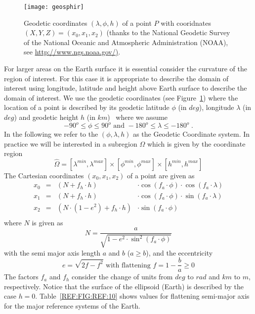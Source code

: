 \begin{figure}[t]
    \centering\texttt{[image: geosphir]}
    \caption{Geodetic coordinates  $( \lambda, \phi,h)$ of a point $P$ with 
cooridnates $(X,Y,Z)=(x_0,x_1,x_2)$ (thanks to the National Geodetic Survey of the National Oceanic and Atmospheric Administration (NOAA), 
see \url{http://www.ngs.noaa.gov/)}.
}
    \label{fig:geodeticDomain}
\end{figure}
For larger areas on the Earth surface it is essential consider the curvature of the region of interest. For this case 
it is appropriate to describe the domain of interest using longitude, latitude and height above Earth surface to describe 
the domain of interest. We use the geodetic coordinates (see Figure~\ref{fig:geodeticDomain}) where the location of a point 
is described by its geodetic latitude $\phi$ (in $deg$), longitude 
$\lambda$ (in $deg$) and geodetic height $h$ (in $km$)~\cite{Featherstone2008a} where we assume
\begin{equation}
  -90^o \le \phi \le 90^o \mbox{ and } -180^o \le \lambda \le -180^o \;.
\end{equation} 
In the following we refer to the $(\phi, \lambda, h)$ as the Geodetic Coordinate system.
In practice we will be interested in a subregion $\Omega$ which is given by the coordinate region   
\begin{equation} \label{REF:EQU:INTRO 8b}
\widehat{\Omega} = 
 [\lambda^{min}, \lambda^{max}] \times [\phi^{min}, \phi^{max}] \times
 [h^{min}, h^{max}] 
\end{equation} 
The Cartesian coordinates $(x_0,x_1,x_2)$ of a point are given as 
\begin{equation}
\begin{array}{rcll}
   x_0 & = &  (N + f_{h}  \cdot  h) & \cdot \cos(f_{a} \cdot  \phi) \cdot  \cos(f_{a} \cdot  \lambda) \\
   x_1 & = &  (N + f_{h}  \cdot  h) & \cdot  \cos(f_{a} \cdot  \phi) \cdot  \sin(f_{a} \cdot  \lambda) \\
   x_2 & = &  (N \cdot (1-e^2) + f_{h}  \cdot  h ) & \cdot  \sin(f_{a} \cdot  \phi)\\
\end{array}
\label{equ:geodetic:1}
\end{equation} 
where $N$ is given as 
\begin{equation}
 N = \frac{a}{\sqrt{1- e^2 \cdot \sin^2(f_{a} \cdot  \phi) }}
\label{equ:geodetic:2}
\end{equation}
with the semi major axis length $a$ and $b$ ($ a \ge b$), and the eccentricity 
\begin{equation} \label{equ:ref:coordinates:100}
e = \sqrt{2f - f^2} \mbox{ with flattening } f = 1-\frac{b}{a} \ge 0
\end{equation}
The factors $f_{a}$ and $f_{h}$ consider the change of units from 
$deg$ to $rad$ and $km$ to $m$, respectively.
Notice that the surface of the ellipsoid (Earth) is described by the case $h=0$.  Table~\ref{REF:FIG:REF:10}
shows values for  flattening semi-major axis for the major reference systems of the Earth.

